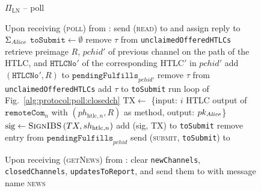   \begin{figure}[H]
    \begin{protocolbox}{$\Pi_{\mathrm{LN}}$ -- poll}
      \begin{algorithmic}[1]
        \State Upon receiving (\textsc{poll}) from \environment:
        \Indent
          \State send (\textsc{read}) to \ledger{} and assign reply to
          $\Sigma_{\mathit{Alice}}$
          \label{alg:protocol:poll:read}
          \State $\mathtt{toSubmit} \gets \emptyset$
          \label{alg:protocol:poll:afterread}
             
              \State remove $\tau$ from \texttt{unclaimedOfferedHTLCs}
                \State retrieve preimage $R$, $\mathit{pchid}'$ of previous
                channel on the path of the HTLC, and $\mathtt{HTLCNo}'$ of the
                corresponding $\mathrm{HTLC}'$ in $\mathit{pchid}'$
                \State add $\left(\mathtt{HTLCNo}', R\right)$ to
                $\mathtt{pendingFulfills}_{\mathit{pchid}'}$
              \EndIf
              \State remove $\tau$ from \texttt{unclaimedOfferedHTLCs}
              \State add $\tau$ to \texttt{toSubmit}
            \EndIf
          \EndFor
          \State run loop of Fig.~\ref{alg:protocol:poll:closedch}
                \State $\mathrm{TX} \gets$ \{input: $i$ HTLC output of
                $\mathtt{remoteCom}_n$ with $\left(ph_{\mathrm{htlc}, n},
                R\right)$ as method, output: $pk_{\mathit{Alice}}$\}
                \State $\mathrm{sig} \gets \textsc{SignIBS}\left(TX,
                sh_{\mathrm{htlc}, n}\right)$
                \State add (sig, TX) to \texttt{toSubmit}
                \State remove entry from
                $\mathtt{pendingFulfills}_{\mathit{pchid}}$
              \EndIf
            \EndFor
          \EndFor
          \label{alg:protocol:poll:beforesubmit}
          \State send (\textsc{submit}, \texttt{toSubmit}) to \ledger
          \label{alg:protocol:poll:submit}
        \EndIndent
        \Statex

        \State Upon receiving (\textsc{getNews}) from \environment:
        \label{alg:protocol:getnews}
        \Indent
          \State clear \texttt{newChannels}, \texttt{closedChannels},
          \texttt{updatesToReport},  and send
          them to \environment{} with message name \textsc{news}
          \label{alg:protocol:getnews:send}
        \EndIndent
      \end{algorithmic}
    \end{protocolbox}
    \caption{}
    \label{alg:protocol:poll}
  \end{figure}


